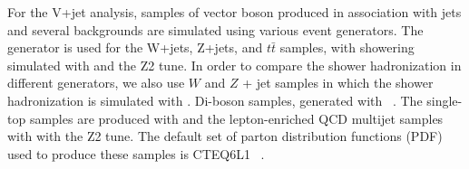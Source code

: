 For the V+jet analysis, samples of vector boson produced in association with jets and several backgrounds are simulated using various event generators.
The ~\cite{madgraph} generator is used for the W+jets, Z+jets, and $t\bar{t}$ samples, with showering simulated with \PYTHIA and the Z2 tune. In order to compare the shower hadronization in different generators, we also use $W$ and $Z$ + jet samples in which the shower hadronization is simulated with \HERWIG.  
Di-boson samples, generated with \PYTHIA ~\cite{pythia}. The
single-top samples are produced with \POWHEG and the lepton-enriched QCD multijet samples with \PYTHIA with the Z2 tune. The default set of parton distribution functions (PDF) used to produce these samples is CTEQ6L1 ~\cite{cteq}. %


